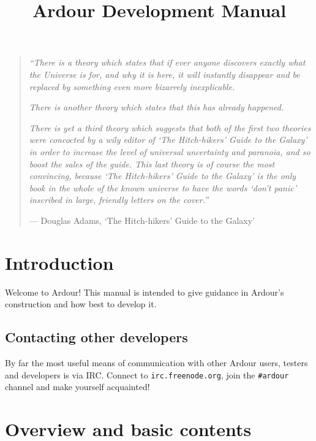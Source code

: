 \documentclass[10pt,a4paper]{book}
\title{Ardour Development Manual}
\author{}
\begin{document}
\maketitle

\clearpage
\thispagestyle{empty}

\bigskip
\bigskip
\bigskip

\begin{quote}

\emph{``There is a theory which states that if ever anyone discovers
  exactly what the Universe is for, and why it is here, it will
  instantly disappear and be replaced by something even more bizarrely
  inexplicable.}

\smallskip

\emph{There is another theory which states that this has
  already happened.}

\smallskip

\emph{There is yet a third theory which suggests that
  both of the first two theories were concocted by a wily editor of
  `The Hitch-hikers' Guide to the Galaxy' in order to increase the
  level of universal uncertainty and paranoia, and so boost the sales
  of the guide.  This last theory is of course the most convincing,
  because `The Hitch-hikers' Guide to the Galaxy' is the only book in
  the whole of the known universe to have the words `don't panic'
  inscribed in large, friendly letters on the cover.''}

\smallskip

--- Douglas Adams, `The Hitch-hikers' Guide to the Galaxy'
\end{quote}

\chapter{Introduction}

Welcome to Ardour!  This manual is intended to give guidance in
Ardour's construction and how best to develop it.

\section{Contacting other developers}

By far the most useful means of communication with other Ardour users,
testers and developers is via IRC.  Connect to
\texttt{irc.freenode.org}, join the \texttt{\#ardour} channel and make
yourself acquainted!

\chapter{Overview and basic contents}
\end{document}
